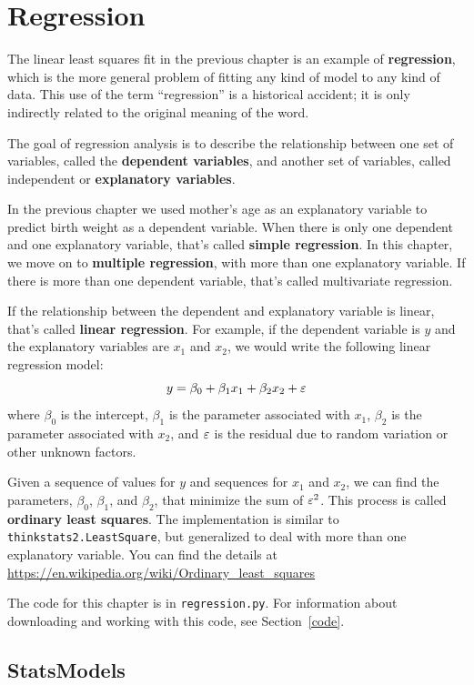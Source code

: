 \documentclass[12pt]{book}
\begin{document}
\chapter{Regression}
\label{regression}

The linear least squares fit in the previous chapter is an example of
{\bf regression}, which is the more general problem of fitting any
kind of model to any kind of data.  This use of the term ``regression''
is a historical accident; it is only indirectly related to the
original meaning of the word.

The goal of regression analysis is to describe the relationship
between one set of variables, called the {\bf dependent variables},
and another set of variables, called independent or {\bf
  explanatory variables}.

In the previous chapter we used mother's age as an explanatory
variable to predict birth weight as a dependent variable.  When there
is only one dependent and one explanatory variable, that's called {\bf
  simple regression}.  In this chapter, we move on to {\bf multiple
  regression}, with more than one explanatory variable.  If there is
more than one dependent variable, that's called multivariate
regression.

If the relationship between the dependent and explanatory variable
is linear, that's called {\bf linear regression}.  For example,
if the dependent variable is $y$ and the explanatory variables
are $x_1$ and $x_2$, we would write the following linear
regression model:
%
\[ y = \beta_0 + \beta_1 x_1 + \beta_2 x_2 + \varepsilon \]
%
where $\beta_0$ is the intercept, $\beta_1$ is the parameter
associated with $x_1$, $\beta_2$ is the parameter associated with
$x_2$, and $\varepsilon$ is the residual due to random variation or other
unknown factors.

Given a sequence of values for $y$ and sequences for $x_1$ and $x_2$,
we can find the parameters, $\beta_0$, $\beta_1$, and $\beta_2$, that
minimize the sum of $\varepsilon^2$.  This process is called
{\bf ordinary least squares}.  The implementation is similar to {\tt
  thinkstats2.LeastSquare}, but generalized to deal with more than one
explanatory variable.  You can find the details at
\url{https://en.wikipedia.org/wiki/Ordinary_least_squares}

The code for this chapter is in {\tt regression.py}.  For information
about downloading and working with this code, see Section~\ref{code}.

\section{StatsModels}
\end{document}
